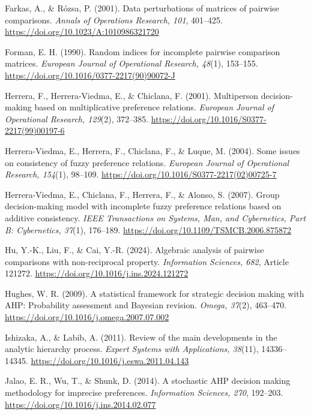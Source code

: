 \documentclass[11pt]{amsart}
\theoremstyle{definition}
\theoremstyle{plain}
\numberwithin{equation}{section}
\begin{document}
\begin{thebibliography}{}
Farkas, A., \& R\'ozsa, P. (2001).
Data perturbations of matrices of pairwise comparisons.
\textit{Annals of Operations Research, 101}, 401--425.
\url{https://doi.org/10.1023/A:1010986321720}

Forman, E. H. (1990).
Random indices for incomplete pairwise comparison matrices.
\textit{European Journal of Operational Research, 48}(1), 153--155.
\url{https://doi.org/10.1016/0377-2217(90)90072-J}

Herrera, F., Herrera-Viedma, E., \& Chiclana, F. (2001).
Multiperson decision-making based on multiplicative preference relations.
\textit{European Journal of Operational Research, 129}(2), 372--385.
\url{https://doi.org/10.1016/S0377-2217(99)00197-6}

Herrera-Viedma, E., Herrera, F., Chiclana, F., \& Luque, M. (2004).
Some issues on consistency of fuzzy preference relations.
\textit{European Journal of Operational Research, 154}(1), 98--109.
\url{https://doi.org/10.1016/S0377-2217(02)00725-7}

Herrera-Viedma, E., Chiclana, F., Herrera, F., \& Alonso, S. (2007).
Group decision-making model with incomplete fuzzy preference relations based on additive consistency.
\textit{IEEE Transactions on Systems, Man, and Cybernetics, Part B: Cybernetics, 37}(1), 176--189.
\url{https://doi.org/10.1109/TSMCB.2006.875872}

Hu, Y.-K., Liu, F., \& Cai, Y.-R. (2024).
Algebraic analysis of pairwise comparisons with non-reciprocal property.
\textit{Information Sciences, 682}, Article 121272.
\url{https://doi.org/10.1016/j.ins.2024.121272}

Hughes, W. R. (2009).
A statistical framework for strategic decision making with AHP: Probability assessment and Bayesian revision.
\textit{Omega, 37}(2), 463--470.
\url{https://doi.org/10.1016/j.omega.2007.07.002}

Ishizaka, A., \& Labib, A. (2011).
Review of the main developments in the analytic hierarchy process.
\textit{Expert Systems with Applications, 38}(11), 14336--14345.
\url{https://doi.org/10.1016/j.eswa.2011.04.143}

Jalao, E. R., Wu, T., \& Shunk, D. (2014).
A stochastic AHP decision making methodology for imprecise preferences.
\textit{Information Sciences, 270}, 192--203.
\url{https://doi.org/10.1016/j.ins.2014.02.077}


\end{thebibliography}
\end{document}
